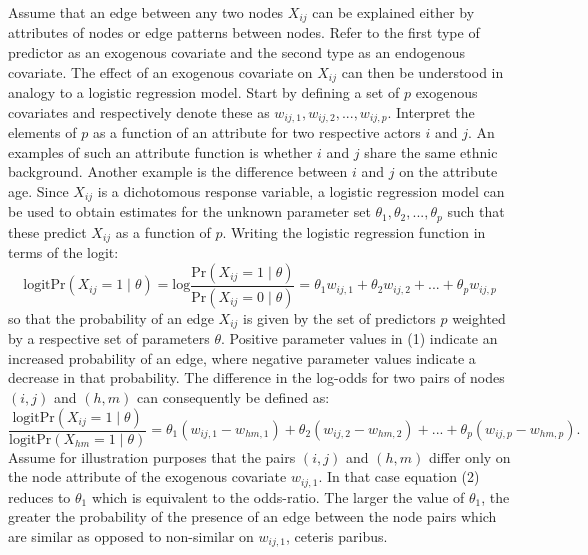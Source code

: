 \documentclass[a4paper, man]{apa6}
\begin{document}
Assume that an edge between any two nodes $X_{ij}$ can be explained either by attributes of nodes or edge patterns between nodes. Refer to the first type of predictor as an exogenous covariate and the second type as an endogenous covariate. The effect of an exogenous covariate on $X_{ij}$ can then be understood in analogy to a logistic regression model. Start by defining a set of $p$ exogenous covariates and respectively denote these as $w_{ij,1}, w_{ij,2}, ..., w_{ij,p}$. Interpret the elements of $p$ as a function of an attribute for two respective actors $i$ and $j$. An examples of such an attribute function is whether $i$ and $j$ share the same ethnic background. Another example is the difference between $i$ and $j$ on the attribute age. Since $X_{ij}$ is a dichotomous response variable, a logistic regression model can be used to obtain estimates for the unknown parameter set $\theta_{1}, \theta_{2}, ..., \theta_{p}$ such that these predict $X_{ij}$ as a function of $p$. Writing the logistic regression function in terms of the logit: \begin{equation} \text{logitPr}(X_{ij} = 1 \mid \theta) = \text{log}\frac{\text{Pr}(X_{ij} = 1 \mid \theta)}{\text{Pr}(X_{ij} = 0 \mid \theta)} = \theta_{1}w_{ij,1} + \theta_{2}w_{ij,2} + ... + \theta_{p}w_{ij, p} \end{equation} so that the probability of an edge $X_{ij}$ is given by the set of  predictors $p$ weighted by a respective set of parameters $\theta$. Positive parameter values in (1) indicate an increased probability of an edge, where negative parameter values indicate a decrease in that probability. The difference in the log-odds for two pairs of nodes $(i, j)$ and $(h, m)$ can consequently be defined as: \begin{equation} \frac{\text{logitPr}(X_{ij} = 1 \mid \theta)}{\text{logitPr}(X_{hm} = 1 \mid \theta)} = \theta_{1}(w_{ij,1} - w_{hm,1}) + \theta_{2}(w_{ij,2} - w_{hm,2}) + ... + \theta_{p}(w_{ij, p} - w_{hm, p}).\end{equation} \clearpage \noindent Assume for illustration purposes that the pairs $(i, j)$ and $(h, m)$ differ only on the node attribute of the exogenous covariate $w_{ij,1}$. In that case equation (2) reduces to $\theta_{1}$ which is equivalent to the odds-ratio. The larger the value of $\theta_{1}$, the greater the probability of the presence of an edge between the node pairs which are similar as opposed to non-similar on $w_{ij, 1}$, ceteris paribus.
\\
\end{document}
